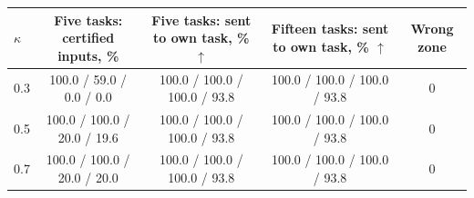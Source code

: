 \begin{tabular}{lcccc}
    \toprule
    $\kappa$ & \shortstack[c]{Five tasks:\\certified inputs, \%} & \shortstack[c]{Five tasks: sent to\\own task, \% $\uparrow$} & \shortstack[c]{Fifteen tasks: sent to\\own task, \% $\uparrow$} & Wrong zone \\
    \midrule
    0.3 & 100.0 / 59.0 / 0.0 / 0.0 & 100.0 / 100.0 / 100.0 / 93.8 & 100.0 / 100.0 / 100.0 / 93.8 & 0 \\
    0.5 & 100.0 / 100.0 / 20.0 / 19.6 & 100.0 / 100.0 / 100.0 / 93.8 & 100.0 / 100.0 / 100.0 / 93.8 & 0 \\
    0.7 & 100.0 / 100.0 / 20.0 / 20.0 & 100.0 / 100.0 / 100.0 / 93.8 & 100.0 / 100.0 / 100.0 / 93.8 & 0 \\
    \bottomrule
\end{tabular}

